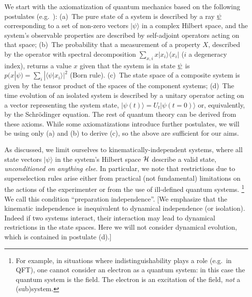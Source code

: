 \documentclass[aps,prl,amsmath,amssymb,twocolumn]{revtex4}
\theoremstyle{plain}
\theoremstyle{definition}
\theoremstyle{remark}
\newcommand{\pj}[1] {\underbar{$#1$}}
\def\>{\rangle}
\def\<{\langle}
\def\comment#1{}
\def\commentg#1{ [{\bf Comment Gabriele:} {\sf #1}]}
\def\togli#1{}
\begin{document}
	We start with the axiomatization of quantum mechanics based on the following
	postulates (e.g.~\cite{ozawa,masanes,wootters,nielsenchuang}): (a)~The pure state of a
	system is described by a ray $\pj{\psi}$ corresponding to a set of
	non-zero vectors $|\psi\>$ in a complex Hilbert space, and the
	system's observable properties are described by self-adjoint operators
	acting on that space; (b)~The probability that a measurement of a
	property $X$, described by the operator with spectral decomposition \comment{Normalizzare qui e in altri posti!}
	$\sum_{x,i}x|x_i\>\<x_i|$ ($i$ a degeneracy index), returns a value
	$x$ given that the system is in state $\pj{\psi}$ is
	$p(x|\psi)=\sum_i|\<\psi|x_i\>|^2$ (Born rule). (c)~The state
	space of a composite system is given by the tensor product of the
	spaces of the component systems; (d)~The time evolution of an isolated
	system is described by a unitary operator acting on a vector
	representing the system state, $|\psi({t})\>=U_{t}|\psi({t}=0)\>$ or,
	equivalently, by the Schr\"odinger equation. The rest of quantum
	theory can be derived from these axioms. While some axiomatizations
	introduce further postulates, we will be using only (a) and (b) to
	derive (c), so the above are sufficient for our aims.
	
	\togli{This axiomatization implicitly contains a definition of
		``quantum system'' which is crucial for what follows, so we need to
		clarify the assumptions that it contains. We will use the following
		definition for a quantum
		system\togli{$\stackon[1pt]={\mbox{\tiny
					def}}$}$\stackrel{\mbox{\tiny def}}=${\em ``a quantum degree
			of freedom with $d$ (possibly discrete, or continuous, infinite)
			mutually exclusive (commuting) values for each of its properties.
			Its mathematical description is through a Hilbert space of
			dimension $d$ which contains all the states that describe the
			values of its possible properties. In accordance with the
			postulate (a), these values correspond to a basis of the space,
			given by the eigenvectors of the observable corresponding to that
			property''}. \commentg{We may have to revise to be more clear.
			Where is this used?} } As discussed, we limit ourselves to
	kinemati\-cal\-ly-inde\-pen\-dent systems, where all state vectors
	$|\psi\>$ in the system's Hilbert space $\cal H$ describe a valid
	state, {\em unconditioned on anything else}. In particular, we note
	that restrictions due to superselection rules arise either from
	practical (not fundamental) limitations on the actions of the
	experimenter \cite{susskind,zanardi,zanardilloyd} or from the use of
	ill-defined quantum systems. \footnote{For example, in situations where
		indistinguishability plays a role (e.g.~in QFT), one cannot consider
		an electron as a quantum system: in this case the quantum system is
		the field. The electron is an excitation of the field, {\em not} a
		(sub)system.} We call this condition ``preparation independence''.  [We
	emphasize that the kinematic independence is inequivalent to dynamical
	independence (or isolation).  Indeed if two systems interact, their
	interaction may lead to dynamical restrictions in the state spaces.
	Here we will not consider dynamical evolution, which is contained in
	postulate (d).]
	
\end{document}
